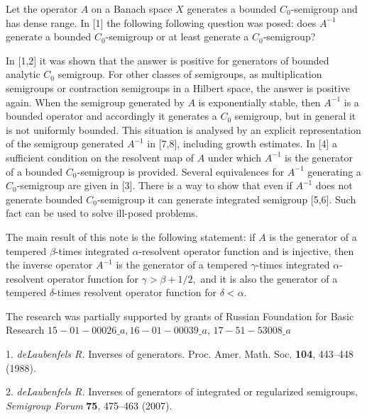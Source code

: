 


\vzmscaption


Let the operator $A$ on a Banach space $X$ generates a bounded $C_0$-semigroup
and has dense range. In [1] the following following question was posed: does
$A^{-1}$ generate a bounded $C_0$-semigroup or at least generate a $C_0$-semigroup?

In [1,2] it was shown  that the answer is positive for generators of bounded
analytic $C_0$ semigroup.  For other classes of semigroups, as multiplication
semigroups or contraction semigroups in a Hilbert space, the answer is positive again.
When the semigroup generated by $A$ is exponentially stable, then $A^{-1}$ is a
bounded operator and accordingly it generates a  $C_0$ semigroup, but in general
it is not uniformly bounded. This situation is analysed by an explicit representation
of the semigroup generated $A^{-1}$ in [7,8], including growth estimates.
In [4] a sufficient condition on the resolvent map of $A$ under which $A^{-1}$
is the generator of a bounded  $C_0$-semigroup is provided. Several equivalences
for $A^{-1}$ generating a $C_0$-semigroup are given in [3]. There is a way to
show that even if $A^{-1}$ does not generate bounded $C_0$-semigroup it can generate
integrated semigroup [5,6]. Such fact can be used to solve ill-posed problems.

The main result of this note is  the following statement: if $A$ is the generator
of a tempered $\beta$-times integrated $\alpha$-resolvent operator function and
is injective, then the inverse operator $A^{-1}$ is the generator of a tempered
$\gamma$-times integrated $\alpha$-resolvent operator function for
$\gamma > \beta+1/2,$ and it is also the generator of a tempered $\delta$-times
resolvent operator function for $\delta < \alpha.$


The research was partially  supported by grants of Russian Foundation
for Basic Research  $15-01-00026\_a, 16-01-00039\_a$,
 $17-51-53008{\_}a$



\litlist

1. {\it  deLaubenfels R.} Inverses of generators. Proc. Amer. Math. Soc. \textbf{104}, 443--448 (1988).

2. {\it  deLaubenfels R.} Inverses of generators of integrated or regularized semigroups,
\emph{Semigroup Forum} \textbf{75}, 475--463  (2007).

